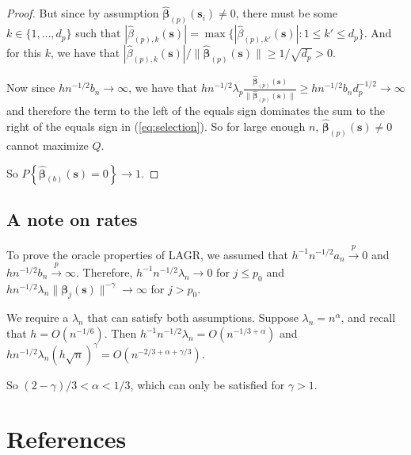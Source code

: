 \documentclass[authoryear, review, 11pt]{elsarticle}
\begin{document}
\begin{proof}
            But since by assumption $\hat{\bm{\beta}}_{(p)} (\bm{s}_i) \ne 0$, there must be some $k \in \{ 1, \dots, d_p \}$ such that $ | \hat{\beta}_{(p),k} (\bm{s}) | = \max \{ | \hat{\beta}_{(p),k'} (\bm{s}) | : 1 \le k' \le d_p \} $. And for this $k$, we have that $| \hat{\beta}_{(p),k} (\bm{s}) | / \| \hat{\bm{\beta}}_{(p)} (\bm{s}) \| \ge 1 / \sqrt{d_p} > 0$.

            Now since $h n^{-1/2} b_n \to \infty$, we have that $h n^{-1/2} \lambda_p \frac{ \hat{\bm{\beta}}_{(p)} (\bm{s}) }{\| \hat{\bm{\beta}}_{(p)} (\bm{s}) \|} \ge h n^{-1/2} b_n d_p^{-1/2} \to \infty$ and therefore the term to the left of the equals sign dominates the sum to the right of the equals sign in (\ref{eq:selection}). So for large enough $n$, $\hat{\bm{\beta}}_{(p)} (\bm{s}) \ne 0$ cannot maximize $Q$.
        
            So $P \left\{ \hat{\bm{\beta}}_{(b)} (\bm{s}) = 0 \right\} \to 1$.
        \end{proof}


    \subsection{A note on rates}
        To prove the oracle properties of LAGR, we assumed that $h^{-1} n^{-1/2} a_n \xrightarrow{p} 0$ and $h n^{-1/2} b_n \xrightarrow{p} \infty$. Therefore, $h^{-1} n^{-1/2} \lambda_n  \to 0$ for $j \le p_0$ and $h n^{-1/2} \lambda_n \| \bm{\beta}_j(\bm{s}) \|^{-\gamma} \to \infty$ for $j > p_0$.
        
        We require a $\lambda_n$ that can satisfy both assumptions. Suppose $\lambda_n = n^{\alpha}$, and recall that $h = O(n^{-1/6})$. Then $h^{-1} n^{-1/2} \lambda_n = O(n^{-1/3 + \alpha})$ and $h n^{-1/2} \lambda_n (h \sqrt{n})^{\gamma} = O(n^{-2/3 + \alpha + \gamma/3})$.
        
        So $ (2 - \gamma)/3 < \alpha < 1/3 $, which can only be satisfied for $\gamma > 1$.

\section{References}


\end{document}
